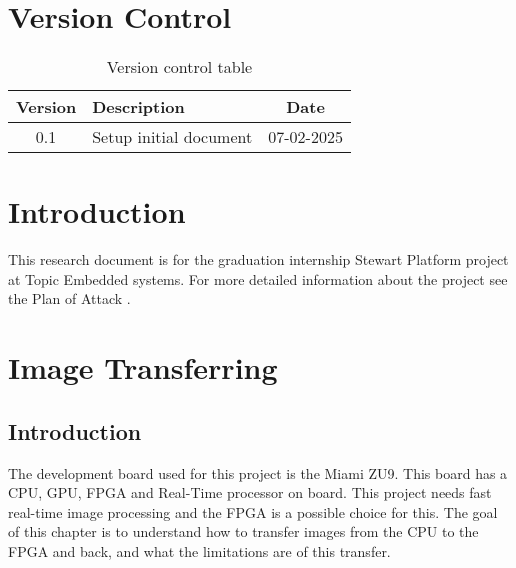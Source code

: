 \documentclass{article}
\begin{document}
\newpage

\section*{Version Control}
\begin{table}[H]
    \begin{center}
        \begin{tabular}{|c|l|c|}
            \hline
            Version & Description & Date \\
            \hline
            0.1 & Setup initial document & 07-02-2025 \\
            \hline
        \end{tabular}
        \caption{Version control table}
    \end{center}
\end{table}
\newpage

\tableofcontents

\section{Introduction}
This research document is for the graduation internship Stewart Platform project at Topic Embedded systems. 
For more detailed information about the project see the Plan of Attack \cite{Plan_of_Attack}.

\newpage

\section{Image Transferring}
\subsection{Introduction}
The development board used for this project is the Miami ZU9.
This board has a CPU, GPU, FPGA and Real-Time processor on board.
This project needs fast real-time image processing and the FPGA is a possible choice for this.
The goal of this chapter is to understand how to transfer images from the CPU to the FPGA and back, and what the limitations are of this transfer.
\end{document}
